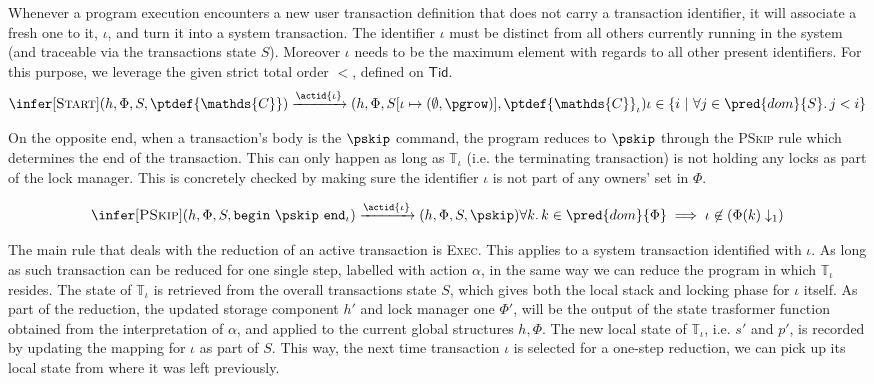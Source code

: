 Whenever a program execution encounters a new user transaction definition that does not carry a transaction identifier, it will associate a fresh one to it, $\iota$, and turn it into a system transaction. The identifier $\iota$ must be distinct from all others currently running in the system (and traceable via the transactions state $S$). Moreover $\iota$ needs to be the maximum element with regards to all other present identifiers. For this purpose, we leverage the given strict total order $<$, defined on $\mathsf{Tid}$.
\[
	\infer[\textsc{Start}]
	{
		(h, \Phi, S, \ptdef{\mathds{C}})
		\xrightarrow{\actid{\iota}}
		(h, \Phi, S[\iota \mapsto (\emptyset, \pgrow)], \ptdef{\mathds{C}}_\iota)
	}
	{
		\iota \in \{ i\ |\ \forall j \in \pred{dom}{S} \ldotp j < i \}
	}
\]

On the opposite end, when a transaction's body is the $\pskip$ command, the program reduces to $\pskip$ through the \textsc{PSkip} rule which determines the end of the transaction. This can only happen as long as $\mathds{T}_\iota$ (i.e. the terminating transaction) is not holding any locks as part of the lock manager. This is concretely checked by making sure the identifier $\iota$ is not part of any owners' set in $\Phi$.

\[
\infer[\textsc{PSkip}]
{
	 (h, \Phi, S, \mathtt{begin}\ \pskip\ \mathtt{end}_\iota)
	\xrightarrow{\actid{\iota}}
	(h, \Phi, S, \pskip)
}
{
	\forall k \ldotp k \in \pred{dom}{\Phi} \implies \iota \not\in \left( \Phi(k) \downarrow_1 \right)
}
\]

The main rule that deals with the reduction of an active transaction is \textsc{Exec}. This applies to a system transaction identified with $\iota$. As long as such transaction can be reduced for one single step, labelled with action $\alpha$, in the same way we can reduce the program in which $\mathds{T}_\iota$ resides. The state of $\mathds{T}_\iota$ is retrieved from the overall transactions state $S$, which gives both the local stack and locking phase for $\iota$ itself. As part of the reduction, the updated storage component $h'$ and lock manager one $\Phi'$, will be the output of the state trasformer function obtained from the interpretation of $\alpha$, and applied to the current global structures $h, \Phi$. The new local state of $\mathds{T}_\iota$, i.e. $s'$ and $p'$, is recorded by updating the mapping for $\iota$ as part of $S$. This way, the next time transaction $\iota$ is selected for a one-step reduction, we can pick up its local state from where it was left previously.

